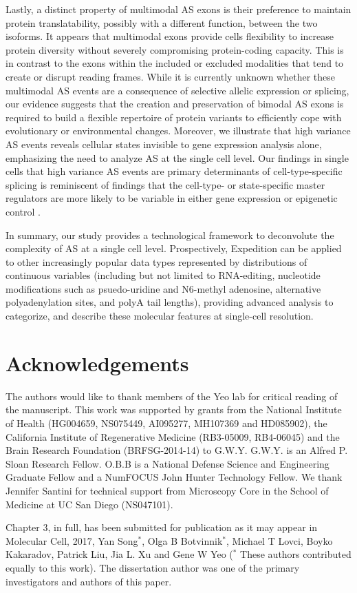 Lastly, a distinct property of multimodal AS exons is their preference to maintain protein translatability, possibly with a different function, between the two isoforms. It appears that multimodal exons provide cells flexibility to increase protein diversity without severely compromising protein-coding capacity. This is in contrast to the exons within the included or excluded modalities that tend to create or disrupt reading frames. While it is currently unknown whether these multimodal AS events are a consequence of selective allelic expression or splicing, our evidence suggests that the creation and preservation of bimodal AS exons is required to build a flexible repertoire of protein variants to efficiently cope with evolutionary or environmental changes. Moreover, we illustrate that high variance AS events reveals cellular states invisible to gene expression analysis alone, emphasizing the need to analyze AS at the single cell level. Our findings in single cells that high variance AS events are primary determinants of cell-type-specific splicing is reminiscent of findings that the cell-type- or state-specific master regulators are more likely to be variable in either gene expression \cite{Shalek2013-ez,Shalek2014-ce} or epigenetic control \cite{Buenrostro:2015jfb}.

In summary, our study provides a technological framework to deconvolute the complexity of AS at a single cell level. Prospectively, Expedition can be applied to other increasingly popular data types represented by distributions of continuous variables (including but not limited to RNA-editing, nucleotide modifications such as psuedo-uridine and N6-methyl adenosine, alternative polyadenylation sites, and polyA tail lengths), providing advanced analysis to categorize, and describe these molecular features at single-cell resolution.

\section{Acknowledgements}
The authors would like to thank members of the Yeo lab for critical reading of the manuscript.  This work was supported by grants from the National Institute of Health (HG004659, NS075449, AI095277, MH107369 and HD085902), the California Institute of Regenerative Medicine (RB3-05009, RB4-06045) and the Brain Research Foundation (BRFSG-2014-14) to G.W.Y. G.W.Y. is an Alfred P. Sloan Research Fellow. O.B.B is a National Defense Science and Engineering Graduate Fellow and a NumFOCUS John Hunter Technology Fellow. We thank Jennifer Santini for technical support from Microscopy Core in the School of Medicine at UC San Diego (NS047101).

Chapter 3, in full, has been submitted for publication as it may appear in Molecular Cell, 2017, Yan Song$^*$, Olga B Botvinnik$^*$, Michael T Lovci, Boyko Kakaradov, Patrick Liu, Jia L. Xu and Gene W Yeo ($^*$ These authors contributed equally to this work).  The dissertation author was one of the primary investigators and authors of this paper. 